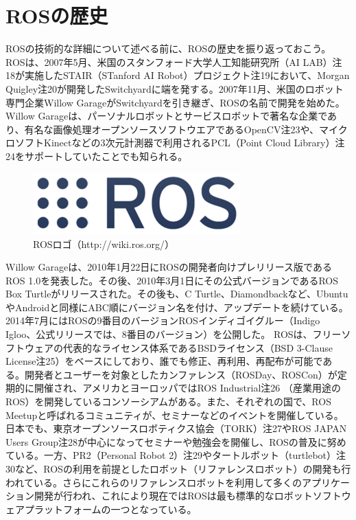 \section{ROSの歴史}

ROSの技術的な詳細について述べる前に、ROSの歴史を振り返っておこう。 ROSは、2007年5月、米国のスタンフォード大学人工知能研究所（AI LAB）注18が実施したSTAIR（STanford AI Robot）プロジェクト注19において、Morgan Quigley注20が開発したSwitchyardに端を発する。2007年11月、米国のロボット専門企業Willow GarageがSwitchyardを引き継ぎ、ROSの名前で開発を始めた。Willow Garageは、パーソナルロボットとサービスロボットで著名な企業であり、有名な画像処理オープンソースソフトウエアであるOpenCV注23や、マイクロソフトKinectなどの3次元計測器で利用されるPCL（Point Cloud Library）注24をサポートしていたことでも知られる。

\begin{figure}[h]
  \centering
  \includegraphics[width=8cm]{pictures/chapter1/pic_01_04.png}
  \caption{ROSロゴ（http://wiki.ros.org/）}
\end{figure}

Willow Garageは、2010年1月22日にROSの開発者向けプレリリース版であるROS 1.0を発表した。その後、2010年3月1日にその公式バージョンであるROS Box Turtleがリリースされた。その後も、C Turtle、Diamondbackなど、UbuntuやAndroidと同様にABC順にバージョン名を付け、アップデートを続けている。 2014年7月にはROSの9番目のバージョンROSインディゴイグルー（Indigo Igloo、公式リリースでは、8番目のバージョン）を公開した。
ROSは、フリーソフトウェアの代表的なライセンス体系であるBSDライセンス（BSD 3-Clause License注25）をベースにしており、誰でも修正、再利用、再配布が可能である。開発者とユーザーを対象としたカンファレンス（ROSDay、ROSCon）が定期的に開催され、アメリカとヨーロッパではROS Industrial注26 （産業用途のROS）を開発しているコンソーシアムがある。また、それぞれの国で、ROS Meetupと呼ばれるコミュニティが、セミナーなどのイベントを開催している。日本でも、東京オープンソースロボティクス協会（TORK）注27やROS JAPAN Users Group注28が中心になってセミナーや勉強会を開催し、ROSの普及に努めている。一方、PR2（Personal Robot 2）注29やタートルボット（turtlebot）注30など、ROSの利用を前提としたロボット（リファレンスロボット）の開発も行われている。さらにこれらのリファレンスロボットを利用して多くのアプリケーション開発が行われ、これにより現在ではROSは最も標準的なロボットソフトウェアプラットフォームの一つとなっている。

